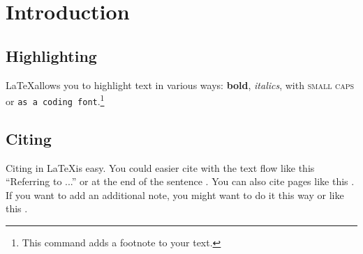 \setcounter{page}{1} %

\section{Introduction} %
\subsection{Highlighting} %
\LaTeX allows you to highlight text in various ways: \textbf{bold}, \textit{italics}, with \textsc{small caps} or \texttt{as a coding font}.\footnote{ This command adds a footnote to your text.}

\subsection{Citing}
Citing in \LaTeX is easy. You could easier cite with the text flow like this ``Referring to \cite {collier2004greed} ...'' or at the end of the sentence \cite{collier2004greed}. You can also cite pages like this \citep[55]{collier2004greed}. If you want to add an additional note, you might want to do it this
way \citep[cp.][22]{collier2004greed} or like this \citep[cp.][]{collier2004greed}.\\ \blindtext %